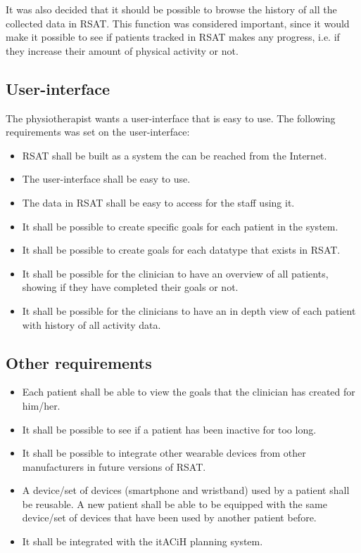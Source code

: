 \documentclass{cslthse-msc}
\begin{document}
It was also decided that it should be possible to browse the history of all the collected data in RSAT. This function was considered important, since it would make it possible to see if patients tracked in RSAT makes any progress, i.e. if they increase their amount of physical activity or not. 

\subsection{User-interface}
The physiotherapist wants a user-interface that is easy to use. The following requirements was set on the user-interface:

\begin{itemize}
    \item RSAT shall be built as a system the can be reached from the Internet.
    \item The user-interface shall be easy to use.
    \item The data in RSAT shall be easy to access for the staff using it.
    \item It shall be possible to create specific goals for each patient in the system.
    \item It shall be possible to create goals for each datatype that exists in RSAT.
    \item It shall be possible for the clinician to have an overview of all patients, showing if they have completed their goals or not. 

    \item It shall be possible for the clinicians to have an in depth view of each patient with history of all activity data.

\end{itemize}

\subsection{Other requirements}
\begin{itemize}
    \item Each patient shall be able to view the goals that the clinician has created for him/her.
    \item It shall be possible to see if a patient has been inactive for too long.
    \item It shall be possible to integrate other wearable devices from other manufacturers in future versions of RSAT.
    \item A device/set of devices (smartphone and wristband) used by a patient shall be reusable. A new patient shall be able to be equipped with the same device/set of devices that have been used by another patient before.
    \item It shall be integrated with the itACiH planning system.
\end{itemize}
\end{document}
